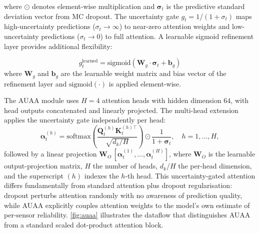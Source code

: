 where $\odot$ denotes element-wise multiplication and $\boldsymbol{\sigma}_t$ is the predictive standard deviation vector from MC dropout. The uncertainty gate $g_t = 1/(1 + \sigma_t)$ maps high-uncertainty predictions ($\sigma_t \to \infty$) to near-zero attention weights and low-uncertainty predictions ($\sigma_t \to 0$) to full attention. A learnable sigmoid refinement layer provides additional flexibility:

\begin{equation}
g_t^{\text{learned}} = \text{sigmoid}(\mathbf{W}_g \cdot \boldsymbol{\sigma}_t + \mathbf{b}_g)
\label{eq:auaa_gate}
\end{equation}
where $\mathbf{W}_g$ and $\mathbf{b}_g$ are the learnable weight matrix and bias vector of the refinement layer and $\mathrm{sigmoid}(\cdot)$ is applied element-wise.

The AUAA module uses $H = 4$ attention heads with hidden dimension $64$, with head outputs concatenated and linearly projected. The multi-head extension applies the uncertainty gate independently per head:
\begin{equation}
\boldsymbol{\alpha}_t^{(h)} = \text{softmax}\!\left(\frac{\mathbf{Q}_t^{(h)} \mathbf{K}_t^{(h)\top}}{\sqrt{d_k/H}}\right) \odot \frac{1}{1 + \boldsymbol{\sigma}_t}, \quad h = 1,\ldots,H,
\label{eq:auaa_multihead}
\end{equation}
followed by a linear projection $\mathbf{W}_O\,[\boldsymbol{\alpha}_t^{(1)},\dots,\boldsymbol{\alpha}_t^{(H)}]$, where $\mathbf{W}_O$ is the learnable output-projection matrix, $H$ the number of heads, $d_k/H$ the per-head dimension, and the superscript $(h)$ indexes the $h$-th head. This uncertainty-gated attention differs fundamentally from standard attention plus dropout regularisation: dropout perturbs attention randomly with no awareness of prediction quality, while AUAA explicitly couples attention weights to the model's own estimate of per-sensor reliability. \cref{fig:auaa} illustrates the dataflow that distinguishes AUAA from a standard scaled dot-product attention block.

